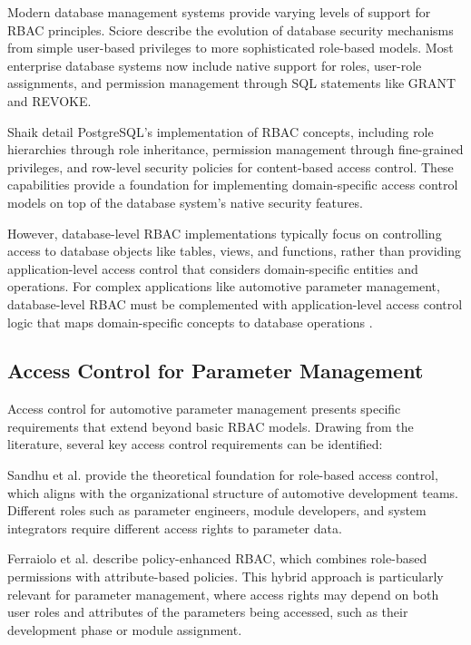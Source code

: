 Modern database management systems provide varying levels of support for \ac{RBAC} principles. Sciore \cite{sciore2009database} describe the evolution of database security mechanisms from simple user-based privileges to more sophisticated role-based models. Most enterprise database systems now include native support for roles, user-role assignments, and permission management through \ac{SQL} statements like GRANT and REVOKE.

Shaik \cite{shaik2020postgresql} detail PostgreSQL's implementation of \ac{RBAC} concepts, including role hierarchies through role inheritance, permission management through fine-grained privileges, and row-level security policies for content-based access control. These capabilities provide a foundation for implementing domain-specific access control models on top of the database system's native security features.

However, database-level \ac{RBAC} implementations typically focus on controlling access to database objects like tables, views, and functions, rather than providing application-level access control that considers domain-specific entities and operations. For complex applications like automotive parameter management, database-level \ac{RBAC} must be complemented with application-level access control logic that maps domain-specific concepts to database operations \cite{ferraiolo2011policy}.

\subsection{Access Control for Parameter Management}
\label{subsec:access-control-parameter-management}

Access control for automotive parameter management presents specific requirements that extend beyond basic \ac{RBAC} models. Drawing from the literature, several key access control requirements can be identified:

Sandhu et al. \cite{sandhu1998role} provide the theoretical foundation for role-based access control, which aligns with the organizational structure of automotive development teams. Different roles such as parameter engineers, module developers, and system integrators require different access rights to parameter data.

Ferraiolo et al. \cite{ferraiolo2011policy} describe policy-enhanced \ac{RBAC}, which combines role-based permissions with attribute-based policies. This hybrid approach is particularly relevant for parameter management, where access rights may depend on both user roles and attributes of the parameters being accessed, such as their development phase or module assignment.

